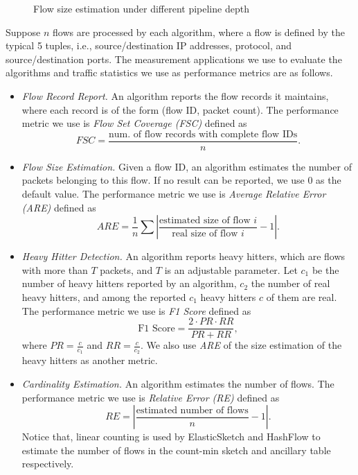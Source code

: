 \begin{figure}
\begin{minipage}{.45\linewidth}
	\caption{Flow size estimation under different pipeline depth}
	\label{fig:comparison_increase_depth}
\end{minipage}
\end{figure}

Suppose $n$ flows are processed by each algorithm, where a flow is defined by the typical 5 tuples, i.e., source/destination IP addresses, protocol, and source/destination ports.
The measurement applications we use to evaluate the algorithms 
and traffic statistics we use as performance metrics are as follows. 

\begin{itemize}
    \item \emph{Flow Record Report.} 
An algorithm reports the flow records it maintains, 
where each record is of the form (flow ID, packet count). 
The performance metric we  use is \emph{Flow Set Coverage (FSC)} defined as 
\[FSC\!=\!\frac{\text{num. of flow records with complete flow IDs}}{n}.\]

    \item \emph{Flow Size Estimation.} 
Given a flow ID, an algorithm estimates the number of 
packets belonging to this flow. If no result can be reported, we use 0 as the default value. 
The performance metric we  use is \emph{Average Relative Error (ARE)} defined as 
\[ARE=\frac{1}{n}\sum\left|\frac{\text{estimated size of flow } i }{\text{real size of flow } i}-1\right|.\]

    \item \emph{Heavy Hitter Detection.} 
An algorithm reports heavy hitters, which are flows with more than $T$ packets, 
and $T$ is an adjustable parameter. 
Let $c_1$ be the number of  heavy hitters reported by an algorithm, 
$c_2$ the number of real heavy hitters, 
and among the reported $c_1$ heavy hitters $c$ of them are real.
The performance metric we use is \emph{F1 Score} defined as
\[\text{F1 Score}=\frac{2\cdot PR\cdot RR}{PR + RR},\]
where $PR = \frac{c}{c_1}$  and $RR=\frac{c}{c_2}$. 
We also use \emph{ARE} of the size estimation of the heavy hitters 
as another metric.

    \item \emph{Cardinality Estimation.} 
An algorithm estimates the number of flows. 
The performance metric we  use is \emph{Relative Error (RE)} defined as 
\[RE =\left|\frac{\text{estimated number of flows}}{n}-1\right|.\]
Notice that, linear counting\cite{whang_linear-time_1990} is used by ElasticSketch and HashFlow to estimate the number of flows in the count-min sketch and ancillary table respectively.


\end{itemize}

